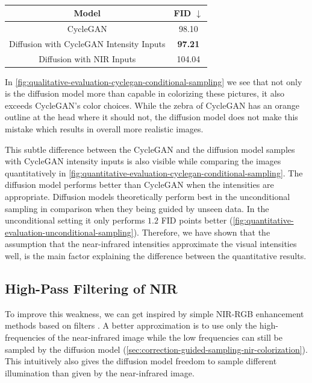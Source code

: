 \begin{table}[htp!]
    \centering
    \begin{tabular}{c | c}
        Model                                    & FID  $\downarrow$ \\
        \hline\hline
        CycleGAN                                 & 98.10             \\
        Diffusion with CycleGAN Intensity Inputs & \textbf{97.21}    \\
        Diffusion with NIR Inputs                & 104.04
    \end{tabular}
    \caption{
    }
    \label{fig:quantitative-evaluation-cyclegan-conditional-sampling}
\end{table}


In \autoref{fig:qualitative-evaluation-cyclegan-conditional-sampling} we see that not only is the diffusion model more than capable in colorizing these pictures,
it also exceeds CycleGAN's color choices. While the zebra of CycleGAN has an orange outline at the head where it should not, the diffusion model does not make this mistake
which results in overall more realistic images.

This subtle difference between the CycleGAN and the diffusion model samples with CycleGAN intensity inputs is also visible while comparing the images quantitatively in \autoref{fig:quantitative-evaluation-cyclegan-conditional-sampling}.
The diffusion model performs better than CycleGAN when the intensities are appropriate.
Diffusion models theoretically perform best in the unconditional sampling in comparison when they being guided by unseen data.
In the unconditional setting it only performs $1.2$ FID points better (\autoref{fig:quantitative-evaluation-unconditional-sampling}).
Therefore, we have shown that the assumption that the near-infrared intensities approximate the visual intensities well,
is the main factor explaining the difference between the quantitative results.

\subsection{High-Pass Filtering of NIR}
\label{sec:high-pass-filter-evaluation}

To improve this weakness, we can get inspired by simple NIR-RGB enhancement methods based on filters \parencite{rgb-nir-image-enhancement}.
A better approximation is to use only the high-frequencies of the near-infrared image while the low frequencies can still be sampled by the diffusion model (\autoref{sec:correction-guided-sampling-nir-colorization}).
This intuitively also gives the diffusion model freedom to sample different illumination than given by the near-infrared image.

